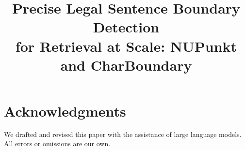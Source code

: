 \documentclass[conference]{IEEEtran}
\begin{document}
\title{Precise Legal Sentence Boundary Detection\\
for Retrieval at Scale: NUPunkt and CharBoundary}

\author{
    \and
    \and
}


\maketitle

\begin{abstract}

\end{abstract}

\pagestyle{plain}








\section*{Acknowledgments}
We drafted and revised this paper with the assistance of large language models.  All errors or omissions are our own.




\onecolumn

\end{document}
